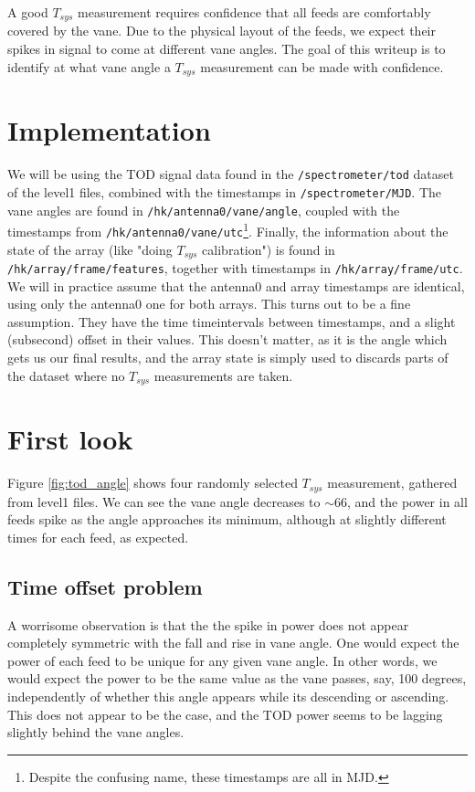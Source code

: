 \documentclass[10pt, a4paper]{article}
\begin{document}
A good $T_{sys}$ measurement requires confidence that all feeds are comfortably covered by the vane. Due to the physical layout of the feeds, we expect their spikes in signal to come at different vane angles. The goal of this writeup is to identify at what vane angle a $T_{sys}$ measurement can be made with confidence.


\section{Implementation}
We will be using the TOD signal data found in the \texttt{/spectrometer/tod} dataset of the level1 files, combined with the timestamps in \texttt{/spectrometer/MJD}. The vane angles are found in \texttt{/hk/antenna0/vane/angle}, coupled with the timestamps from \texttt{/hk/antenna0/vane/utc}\footnote{Despite the confusing name, these timestamps are all in MJD.}. Finally, the information about the state of the array (like "doing $T_{sys}$ calibration") is found in \texttt{/hk/array/frame/features}, together with timestamps in \texttt{/hk/array/frame/utc}. We will in practice assume that the antenna0 and array timestamps are identical, using only the antenna0 one for both arrays. This turns out to be a fine assumption. They have the time timeintervals between timestamps, and a slight (subsecond) offset in their values. This doesn't matter, as it is the angle which gets us our final results, and the array state is simply used to discards parts of the dataset where no $T_{sys}$ measurements are taken.


\section{First look}
Figure \ref{fig:tod_angle} shows four randomly selected $T_{sys}$ measurement, gathered from level1 files. We can see the vane angle decreases to $\sim 66$, and the power in all feeds spike as the angle approaches its minimum, although at slightly different times for each feed, as expected.

\subsection{Time offset problem}
A worrisome observation is that the the spike in power does not appear completely symmetric with the fall and rise in vane angle. One would expect the power of each feed to be unique for any given vane angle. In other words, we would expect the power to be the same value as the vane passes, say, 100 degrees, independently of whether this angle appears while its descending or ascending. This does not appear to be the case, and the TOD power seems to be lagging slightly behind the vane angles.
\end{document}
